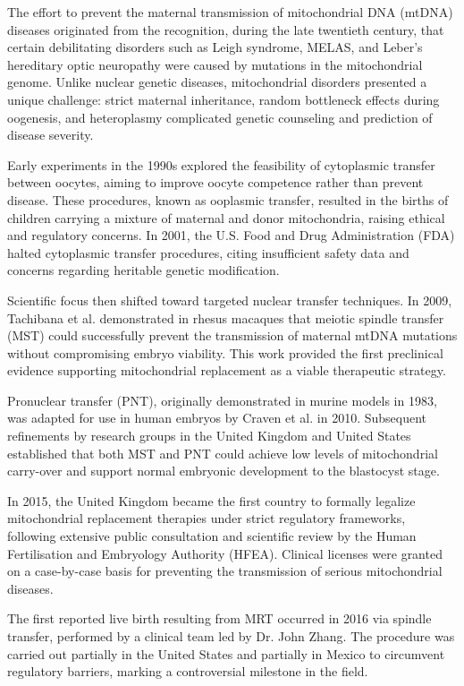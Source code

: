 \begin{historical}

The effort to prevent the maternal transmission of mitochondrial DNA (mtDNA) diseases originated from the recognition, during the late twentieth century, that certain debilitating disorders such as Leigh syndrome, MELAS, and Leber’s hereditary optic neuropathy were caused by mutations in the mitochondrial genome. Unlike nuclear genetic diseases, mitochondrial disorders presented a unique challenge: strict maternal inheritance, random bottleneck effects during oogenesis, and heteroplasmy complicated genetic counseling and prediction of disease severity.

Early experiments in the 1990s explored the feasibility of cytoplasmic transfer between oocytes, aiming to improve oocyte competence rather than prevent disease. These procedures, known as ooplasmic transfer, resulted in the births of children carrying a mixture of maternal and donor mitochondria, raising ethical and regulatory concerns. In 2001, the U.S. Food and Drug Administration (FDA) halted cytoplasmic transfer procedures, citing insufficient safety data and concerns regarding heritable genetic modification.

Scientific focus then shifted toward targeted nuclear transfer techniques. In 2009, Tachibana et al. demonstrated in rhesus macaques that meiotic spindle transfer (MST) could successfully prevent the transmission of maternal mtDNA mutations without compromising embryo viability. This work provided the first preclinical evidence supporting mitochondrial replacement as a viable therapeutic strategy.

Pronuclear transfer (PNT), originally demonstrated in murine models in 1983, was adapted for use in human embryos by Craven et al. in 2010. Subsequent refinements by research groups in the United Kingdom and United States established that both MST and PNT could achieve low levels of mitochondrial carry-over and support normal embryonic development to the blastocyst stage.

In 2015, the United Kingdom became the first country to formally legalize mitochondrial replacement therapies under strict regulatory frameworks, following extensive public consultation and scientific review by the Human Fertilisation and Embryology Authority (HFEA). Clinical licenses were granted on a case-by-case basis for preventing the transmission of serious mitochondrial diseases.

The first reported live birth resulting from MRT occurred in 2016 via spindle transfer, performed by a clinical team led by Dr. John Zhang. The procedure was carried out partially in the United States and partially in Mexico to circumvent regulatory barriers, marking a controversial milestone in the field.


\end{historical}
